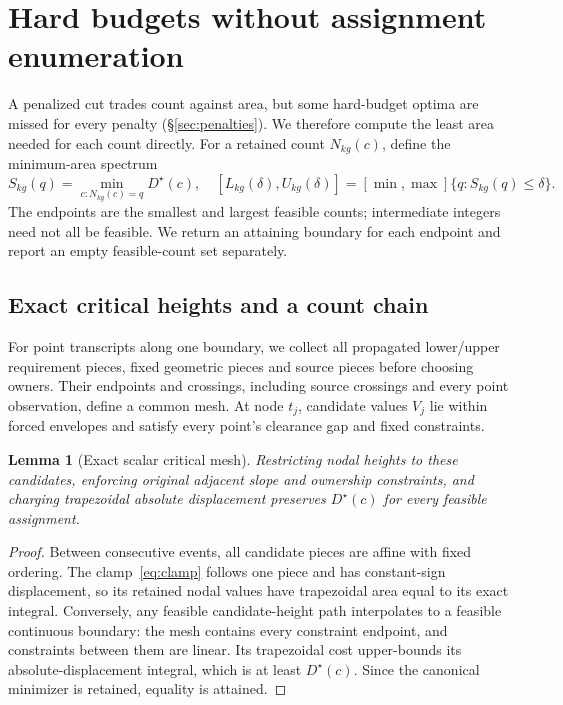 \documentclass[10pt,letterpaper]{article}
\newtheorem{lemma}[theorem]{Lemma}
\begin{document}
\section{Hard budgets without assignment enumeration}\label{sec:counts}
A penalized cut trades count against area, but some hard-budget optima are missed for every penalty (\S\ref{sec:penalties}). We therefore compute the least area needed for each count directly.
For a retained count $N_{kg}(c)$, define the minimum-area spectrum
\begin{equation}
S_{kg}(q)=\min_{c:N_{kg}(c)=q}D^\star(c),\quad
[L_{kg}(\delta),U_{kg}(\delta)]=\left[\min,\max\right]\{q:S_{kg}(q)\le\delta\}.\label{eq:interval}
\end{equation}
The endpoints are the smallest and largest feasible counts; intermediate integers need not all be feasible. We return an attaining boundary for each endpoint and report an empty feasible-count set separately.

\subsection{Exact critical heights and a count chain}
For point transcripts along one boundary, we collect all propagated lower/upper requirement pieces, fixed geometric pieces and source pieces before choosing owners. Their endpoints and crossings, including source crossings and every point observation, define a common mesh. At node $t_j$, candidate values $V_j$ lie within forced envelopes and satisfy every point's clearance gap and fixed constraints.

\begin{lemma}[Exact scalar critical mesh]\label{lem:mesh}
Restricting nodal heights to these candidates, enforcing original adjacent slope and ownership constraints, and charging trapezoidal absolute displacement preserves $D^\star(c)$ for every feasible assignment.
\end{lemma}
\begin{proof}
Between consecutive events, all candidate pieces are affine with fixed ordering. The clamp~\eqref{eq:clamp} follows one piece and has constant-sign displacement, so its retained nodal values have trapezoidal area equal to its exact integral. Conversely, any feasible candidate-height path interpolates to a feasible continuous boundary: the mesh contains every constraint endpoint, and constraints between them are linear. Its trapezoidal cost upper-bounds its absolute-displacement integral, which is at least $D^\star(c)$. Since the canonical minimizer is retained, equality is attained.
\end{proof}
\end{document}
